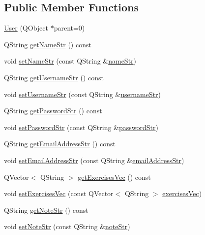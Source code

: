 \subsection*{Public Member Functions}
\begin{DoxyCompactItemize}
\item 
\hyperlink{class_user_aec8c695d31d05b72e1fe0fc186ca3e2f}{User} (Q\-Object $\ast$parent=0)
\item 
Q\-String \hyperlink{class_user_a65e50684b26a7e8d427c3b67a5781f6f}{get\-Name\-Str} () const 
\item 
void \hyperlink{class_user_a4b9beeda4b5b86d7e76273d3532cfa99}{set\-Name\-Str} (const Q\-String \&\hyperlink{class_user_aca80d105a91d9bf8e04fccb4aed742af}{name\-Str})
\item 
Q\-String \hyperlink{class_user_acf682e97742a9d8a1503cf868bdcaebc}{get\-Username\-Str} () const 
\item 
void \hyperlink{class_user_a760015fe2cbd7c12f37ab50aca6761db}{set\-Username\-Str} (const Q\-String \&\hyperlink{class_user_aa05f77ad89b778912aa5c0d87ddf532a}{username\-Str})
\item 
Q\-String \hyperlink{class_user_addd43fc6cdb7bd40318d00af89201add}{get\-Password\-Str} () const 
\item 
void \hyperlink{class_user_aef12dc22c24d21321531e7f4af739171}{set\-Password\-Str} (const Q\-String \&\hyperlink{class_user_af5db2defeb3591fe79226d3fcf7393e7}{password\-Str})
\item 
Q\-String \hyperlink{class_user_affad94438dc558c9c39cfb92882b4a8d}{get\-Email\-Address\-Str} () const 
\item 
void \hyperlink{class_user_aac4f2f5e186b0643fcc1eadfd2d2deaa}{set\-Email\-Address\-Str} (const Q\-String \&\hyperlink{class_user_ac061140cfc7876f2a7433af74ac0cbab}{email\-Address\-Str})
\item 
Q\-Vector$<$ Q\-String $>$ \hyperlink{class_user_ad535f61489bf6a5c9e46ebdbd1f67ada}{get\-Exercises\-Vec} () const 
\item 
void \hyperlink{class_user_a1ab99995af208a4c3e438cfda1b0f671}{set\-Exercises\-Vec} (const Q\-Vector$<$ Q\-String $>$ \hyperlink{class_user_ab57f1403a6cb697291cd8bc77c94918a}{exercises\-Vec})
\item 
Q\-String \hyperlink{class_user_a90912ac4c78ca41ab6e02f55edee0fcf}{get\-Note\-Str} () const 
\item 
void \hyperlink{class_user_acf38efd49a7f4e918240dba4bd40966e}{set\-Note\-Str} (const Q\-String \&\hyperlink{class_user_a94d574465f1be71d870dbf716ca4ffe1}{note\-Str})

\end{DoxyCompactItemize}
